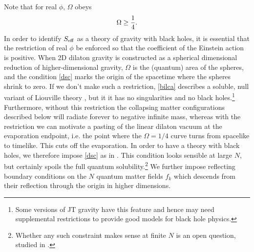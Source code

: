 \documentclass[12pt,oneside,letterpaper]{article}
\newcommand{\be}{\begin{equation}}
\newcommand{\ee}{\end{equation}}
\def\be{\begin{eqnarray}}
\def\ee{\end{eqnarray}}
\def\be{\begin{equation}}
\def\ee{\end{equation}}
\numberwithin{equation}{section}
\def \be {\begin{equation}}
\def \ee {\end{equation}}
\begin{document}
Note that for real $\phi$, $\Omega$ obeys \be\label{dsc} \Omega \ge {1 \over 4}.\ee In order to identify $S_{\rm eff}$ as a theory of gravity with black holes, it is essential that the restriction of real $\phi$ be enforced so that the coefficient of the Einstein action is positive.  When 2D dilaton gravity is constructed as  a spherical dimensional reduction of higher-dimensional gravity, $\Omega$ is  the (quantum) area of the spheres, and the condition \eqref{dsc} marks the origin of the spacetime where the spheres shrink to zero.  If we don't make such a restriction, \eqref{bilca} 
describes  a soluble, null variant of Liouville theory   \cite{deAlwis:1992hv,Bilal:1992kv}, but it it has no singularities and no black holes.\footnote{Some versions  of JT gravity have this feature and hence may need supplemental restrictions to provide good models for black hole physics.}  Furthermore, without this restriction the collapsing matter configurations described below will radiate forever to negative infinite mass, whereas with the restriction we can motivate a pasting of the linear dilaton vacuum at the evaporation endpoint, i.e. the point where the $\Omega = 1/4$ curve turns from spacelike to timelike. This cuts off the evaporation. In order  to have a theory with black holes,   we therefore impose \eqref{dsc} as in \cite{Russo:1992ax,Fiola:1994ir}. This condition looks sensible at large $N$, but certainly spoils the full quantum solubility.\footnote{ Whether any such constraint makes sense at finite $N$ is an open question, studied in \cite{Strominger:1994xi,Polchinski:1994zs}.}  We further impose reflecting boundary conditions on the $N$ quantum matter fields $f_k$  which descends from their reflection  through the origin in higher dimensions. 
\end{document}
